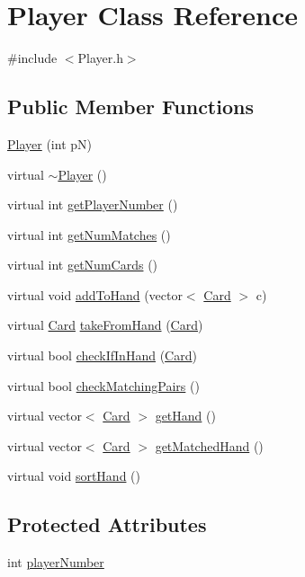 \hypertarget{class_player}{\section{Player Class Reference}
\label{class_player}
}


{\ttfamily \#include $<$Player.\-h$>$}

\subsection*{Public Member Functions}
\begin{DoxyCompactItemize}
\item 
\hyperlink{class_player_a80d1293f6f49b886db318f1dae7be23b}{Player} (int p\-N)
\item 
virtual \hyperlink{class_player_a8981c201ffb2270c0b6dbd467b627376}{$\sim$\-Player} ()
\item 
virtual int \hyperlink{class_player_a31fbbc1c4386e4cc59622561707de58f}{get\-Player\-Number} ()
\item 
virtual int \hyperlink{class_player_a529073d2d9fe03d4a257264165fd254d}{get\-Num\-Matches} ()
\item 
virtual int \hyperlink{class_player_afeea001d79927a2a5fd78610e971f789}{get\-Num\-Cards} ()
\item 
virtual void \hyperlink{class_player_a39cd88ac5969bf7a9f18ae85a3e7ef90}{add\-To\-Hand} (vector$<$ \hyperlink{class_card}{Card} $>$ c)
\item 
virtual \hyperlink{class_card}{Card} \hyperlink{class_player_a9e4de307960ce9cef2e2704a7a73a931}{take\-From\-Hand} (\hyperlink{class_card}{Card})
\item 
virtual bool \hyperlink{class_player_ad5373406c782e50ca655e09e712e9f9a}{check\-If\-In\-Hand} (\hyperlink{class_card}{Card})
\item 
virtual bool \hyperlink{class_player_a8f4860c059f1eba073c0e46ef8442266}{check\-Matching\-Pairs} ()
\item 
virtual vector$<$ \hyperlink{class_card}{Card} $>$ \hyperlink{class_player_a3fd21ebb55fff1b382bc1c4ed73c3a29}{get\-Hand} ()
\item 
virtual vector$<$ \hyperlink{class_card}{Card} $>$ \hyperlink{class_player_a4ccce21812baacf099a025fb90c3862d}{get\-Matched\-Hand} ()
\item 
virtual void \hyperlink{class_player_a2e0498ce6dc3fbbf21d42e010466c41a}{sort\-Hand} ()
\end{DoxyCompactItemize}
\subsection*{Protected Attributes}
\begin{DoxyCompactItemize}
\item 
int \hyperlink{class_player_adfea67ca8c4a03b59fee1bb09789f1bc}{player\-Number}
\end{DoxyCompactItemize}


